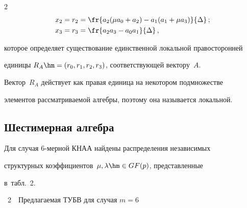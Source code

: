 \begin{multicols}{2}
\begin{align*}
x_2&=r_2=\fr{a_2(\mu a_0+a_2)-a_1(a_1+\mu a_3)}{\Delta}\,;\\ 


x_3&=r_3=\fr{a_2 a_3-a_0 a_1}{\Delta}\,,


\end{align*}


которое определяет существование единственной локальной правосторонней 


единицы $R_A\hm= (r_0, r_1, r_2, r_3)$, соответствующей вектору~$A$. 


Вектор~$R_A$ действует как правая единица на \mbox{некотором} подмножестве 


элементов рассматриваемой ал\-геб\-ры, поэтому она называется локальной. 





  \subsection{Шестимерная алгебра}


  


  Для случая 6-мер\-ной КНАА найдены распределения независимых 


структурных коэффициентов~$\mu, \lambda \hm\in GF(p)$, представленные 


в~табл.~2.





\vspace*{6pt} %





\begin{center}


\noindent


{{\tablename~2}\ \ \small{Предлагаемая ТУБВ для случая $m = 6$}}







\vspace*{6pt}





\tabcolsep=8pt


{\small


 \begin{tabular}{|c|c|c|c|c|c|c|}


  \hline



\end{tabular}}
\end{center}
\end{multicols}
